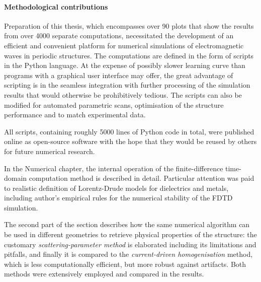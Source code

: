 \paragraph{Methodological contributions}
Preparation of this thesis, which encompasses over 90 plots that show the results from over 4000 separate computations, necessitated the development of an efficient and convenient platform for numerical simulations of electromagnetic waves in periodic structures.
The computations are defined in the form of scripts in the Python language. At the expense of possibly slower learning curve than programs with a graphical user interface may offer, the great advantage of scripting is in the seamless integration with further processing of the simulation results that would otherwise be prohibitively tedious. The scripts can also be modified for automated parametric scans, optimisation of the structure performance and to match experimental data.

All scripts, containing roughly 5000 lines of Python code in total, were published online as open-source software \cite{dominec2014_meep_metamaterials} with the hope that they would be reused by others for future numerical research.

In the Numerical chapter, the internal operation of the finite-difference time-domain computation method is described in detail. Particular attention was paid to realistic definition of Lorentz-Drude models for dielectrics and metals, including author's empirical rules for the numerical stability of the FDTD simulation. 


The second part of the section describes how the same numerical algorithm can be used in different geometries to retrieve physical properties of the structure: the customary \textit{scattering-parameter method} is elaborated including its limitations and pitfalls, and finally it is compared to the \textit{current-driven homogenisation} method, which is less computationally efficient, but more robust against artifacts. Both methods were extensively employed and compared in the results.

